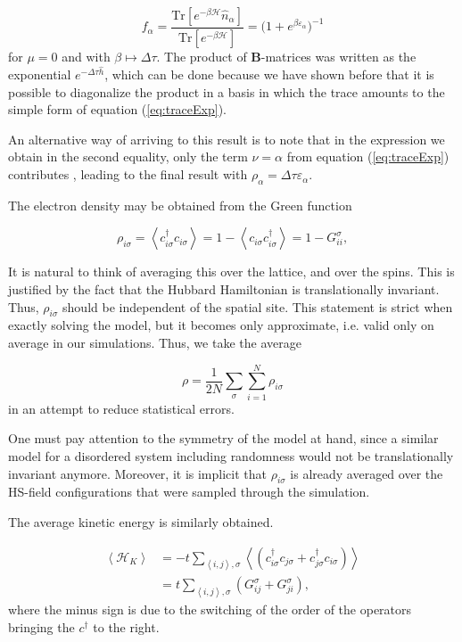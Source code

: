 \documentclass[10pt, twocolumn, twoside]{article}
\begin{document}
\begin{equation}
f_\alpha = \frac{\text{Tr}[e^{-\beta\mathcal{H}} \hat{n}_\alpha]}{\text{Tr}[e^{-\beta\mathcal{H}} ]} = \big(1 + e^{\beta\varepsilon_\alpha} \big)^{-1}
\end{equation}
for $\mu = 0$ and with $\beta \mapsto \Delta \tau$. The product of $\bm B$-matrices was written as the exponential $e^{-\Delta \tau \hat{h}}$, which can be done because we have shown before that it is possible to diagonalize the product in a basis in which the trace amounts to the simple form of equation (\ref{eq:traceExp}).

An alternative way of arriving to this result is to note that in the expression we obtain in the second equality, only the term $\nu = \alpha$ from equation (\ref{eq:traceExp}) contributes \cite{Santos2003}, leading to the final result with $\rho_\alpha = \Delta\tau \varepsilon_\alpha$.

The electron density may be obtained from the Green function

\begin{equation}
\rho_{i\sigma} = \left\langle c_{i\sigma}^\dagger c_{i\sigma} \right\rangle = 1 - \left\langle c_{i\sigma} c_{i\sigma}^\dagger \right\rangle = 1 - G_{ii}^\sigma ,
\end{equation}

It is natural to think of averaging this over the lattice, and over the spins. This is justified by the fact that the Hubbard Hamiltonian is translationally invariant. Thus, $\rho_{i\sigma}$ should be independent of the spatial site. This statement is strict when exactly solving the model, but it becomes only approximate, i.e. valid only on average in our simulations. Thus, we take the average

\begin{equation}
\rho = \frac{1}{2N} \sum_\sigma \sum_{i=1}^N \rho_{i\sigma}
\end{equation}
in an attempt to reduce statistical errors.

One must pay attention to the symmetry of the model at hand, since a similar model for a disordered system including randomness would not be translationally invariant anymore. Moreover, it is implicit that $\rho_{i\sigma}$ is already averaged over the HS-field configurations that were sampled through the simulation.

The average kinetic energy is similarly obtained.

\begin{equation}
\begin{split}
\left\langle \mathcal{H}_K \right\rangle &= - t  \sum_{\left\langle i, j \right\rangle , \sigma} \left\langle ( c_{i\sigma}^\dagger c_{j\sigma} + c_{j\sigma}^\dagger c_{i\sigma} ) \right\rangle \\
&= t \sum_{\left\langle i, j \right\rangle , \sigma} ( G_{ij}^\sigma + G_{ji}^\sigma ) ,
\end{split}
\end{equation}
where the minus sign is due to the switching of the order of the operators bringing the $c^\dagger$ to the right.
\end{document}
